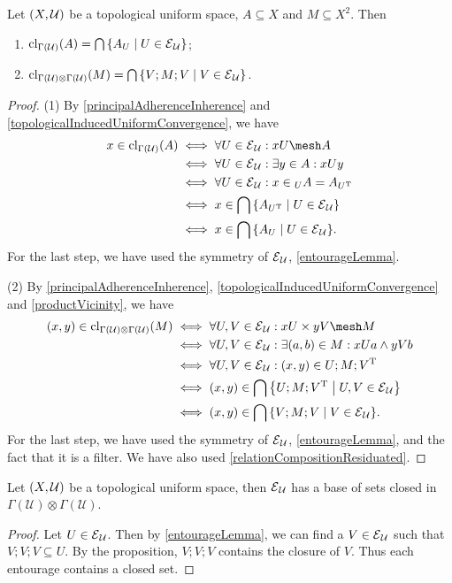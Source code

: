 \begin{proposition}
Let $\sSet{X,\mathcal{U}}$ be a topological uniform space, $A\subseteq X$ and $M\subseteq X^2$. Then
\begin{enumerate}
\item $\closure_{\Gamma(\mathcal{U})}(A) = \bigcap\setbuilder{A_U}{U\in \entourage_\mathcal{U}}$;
\item $\closure_{\Gamma(\mathcal{U})\otimes \Gamma(\mathcal{U})}(M) = \bigcap\setbuilder{V;M;V}{V\in\entourage_\mathcal{U}}$.
\end{enumerate}
\end{proposition}
\begin{proof}
(1) By \ref{principalAdherenceInherence} and \ref{topologicalInducedUniformConvergence}, we have
\begin{align*}
x\in \closure_{\Gamma(\mathcal{U})}(A) &\iff \forall U\in \entourage_\mathcal{U}: xU \mesh A \\
&\iff \forall U\in \entourage_\mathcal{U}: \exists y\in A: xUy \\
&\iff \forall U\in \entourage_\mathcal{U}: x\in {_U}A = A_{U^\transp} \\
&\iff x\in\bigcap\setbuilder{A_{U^\transp}}{U\in \entourage_\mathcal{U}} \\
&\iff x\in\bigcap\setbuilder{A_U}{U\in \entourage_\mathcal{U}}.
\end{align*}
For the last step, we have used the symmetry of $\operatorname{\mathcal{E}}_\mathcal{U}$, \ref{entourageLemma}.

(2) By \ref{principalAdherenceInherence}, \ref{topologicalInducedUniformConvergence} and \ref{productVicinity}, we have
\begin{align*}
(x,y) \in \closure_{\Gamma(\mathcal{U})\otimes \Gamma(\mathcal{U})}(M) &\iff \forall U,V\in \entourage_\mathcal{U}: xU \times yV \mesh M \\
&\iff \forall U,V\in \entourage_\mathcal{U}:\exists (a,b)\in M: xUa \land yVb \\
&\iff \forall U,V\in \entourage_\mathcal{U}:(x,y) \in U;M;V^\transp \\
&\iff (x,y) \in \bigcap\setbuilder{U;M;V^\transp}{U,V\in\entourage_\mathcal{U}} \\
&\iff (x,y) \in \bigcap\setbuilder{V;M;V}{V\in\entourage_\mathcal{U}}.
\end{align*}
For the last step, we have used the symmetry of $\operatorname{\mathcal{E}}_\mathcal{U}$, \ref{entourageLemma}, and the fact that it is a filter. We have also used \ref{relationCompositionResiduated}.
\end{proof}
\begin{corollary} \label{topologicalEntourageFilterBaseClosedSets}
Let $\sSet{X,\mathcal{U}}$ be a topological uniform space, then $\operatorname{\mathcal{E}}_\mathcal{U}$ has a base of sets closed in $\Gamma(\mathcal{U})\otimes \Gamma(\mathcal{U})$.
\end{corollary}
\begin{proof}
Let $U\in \operatorname{\mathcal{E}}_\mathcal{U}$. Then by \ref{entourageLemma}, we can find a $V\in\operatorname{\mathcal{E}}_\mathcal{U}$ such that $V;V;V\subseteq U$. By the proposition, $V;V;V$ contains the closure of $V$. Thus each entourage contains a closed set.
\end{proof}

